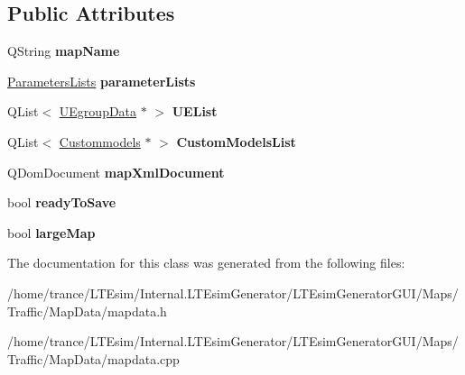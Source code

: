\subsection*{Public Attributes}
\begin{DoxyCompactItemize}
\item 
Q\+String {\bfseries map\+Name}\hypertarget{class_map_data_ae211b4c37ab8440462a6b9f76ca865ac}{}\label{class_map_data_ae211b4c37ab8440462a6b9f76ca865ac}

\item 
\hyperlink{struct_parameters_lists}{Parameters\+Lists} {\bfseries parameter\+Lists}\hypertarget{class_map_data_a4fe07a1487934e92672769cb3c00b665}{}\label{class_map_data_a4fe07a1487934e92672769cb3c00b665}

\item 
Q\+List$<$ \hyperlink{class_u_egroup_data}{U\+Egroup\+Data} $\ast$ $>$ {\bfseries U\+E\+List}\hypertarget{class_map_data_a2ee66eca23e9dd35e68445c7c9c90523}{}\label{class_map_data_a2ee66eca23e9dd35e68445c7c9c90523}

\item 
Q\+List$<$ \hyperlink{class_custommodels}{Custommodels} $\ast$ $>$ {\bfseries Custom\+Models\+List}\hypertarget{class_map_data_add304b2782da80e245e832aa5e724963}{}\label{class_map_data_add304b2782da80e245e832aa5e724963}

\item 
Q\+Dom\+Document {\bfseries map\+Xml\+Document}\hypertarget{class_map_data_acb7b058fe3b817d43e5a1beecb4ec337}{}\label{class_map_data_acb7b058fe3b817d43e5a1beecb4ec337}

\item 
bool {\bfseries ready\+To\+Save}\hypertarget{class_map_data_a2f08ed2c788e33a86b357db67b78935c}{}\label{class_map_data_a2f08ed2c788e33a86b357db67b78935c}

\item 
bool {\bfseries large\+Map}\hypertarget{class_map_data_a04a5463ddd13e1481dcd53bd025c17ca}{}\label{class_map_data_a04a5463ddd13e1481dcd53bd025c17ca}

\end{DoxyCompactItemize}


The documentation for this class was generated from the following files\+:\begin{DoxyCompactItemize}
\item 
/home/trance/\+L\+T\+Esim/\+Internal.\+L\+T\+Esim\+Generator/\+L\+T\+Esim\+Generator\+G\+U\+I/\+Maps/\+Traffic/\+Map\+Data/mapdata.\+h\item 
/home/trance/\+L\+T\+Esim/\+Internal.\+L\+T\+Esim\+Generator/\+L\+T\+Esim\+Generator\+G\+U\+I/\+Maps/\+Traffic/\+Map\+Data/mapdata.\+cpp\end{DoxyCompactItemize}
